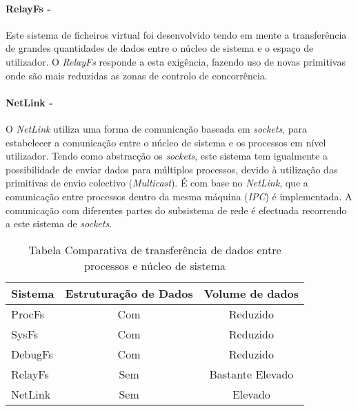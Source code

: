 \paragraph*{RelayFs - }\label{cap:RelayFs_overview}

Este sistema de ficheiros virtual foi desenvolvido tendo em mente a transferência de grandes quantidades de dados entre o núcleo de sistema e o espaço de utilizador.
O \textit{RelayFs} responde a esta exigência, fazendo uso de novas primitivas onde são mais reduzidas as zonas de controlo de concorrência\cite{Donovan2007}.

\paragraph*{NetLink - }\label{cap:NetLink_overview}
O \textit{NetLink} utiliza uma forma de comunicação baseada em \textit{sockets}, para estabelecer a comunicação entre o núcleo de sistema e os processos em nível utilizador. 
 Tendo como abstracção os \textit{sockets}, este sistema tem igualmente a possibilidade de enviar dados para múltiplos processos, devido à utilização das primitivas de envio colectivo (\textit{Multicast}).
 É com base no \textit{NetLink}, que a comunicação entre processos dentro da mesma máquina (\textit{IPC}) é implementada.
 A comunicação com diferentes partes do subsistema de rede é efectuada recorrendo a este sistema de \textit{sockets}.




\begin{table}[h]
\begin{center}

\begin{tabular}{|l||c|c|}
\hline
Sistema & Estruturação de Dados & Volume de dados \\
\hline
ProcFs & Com & Reduzido \\
\hline
SysFs & Com & Reduzido \\
\hline
DebugFs & Com & Reduzido \\
\hline
RelayFs & Sem & Bastante Elevado \\
\hline
NetLink & Sem & Elevado \\
\hline
\end{tabular}
\caption{Tabela Comparativa de transferência de dados entre processos e núcleo de sistema}
\label{tab:transf_compare}
\end{center}
\end{table}

